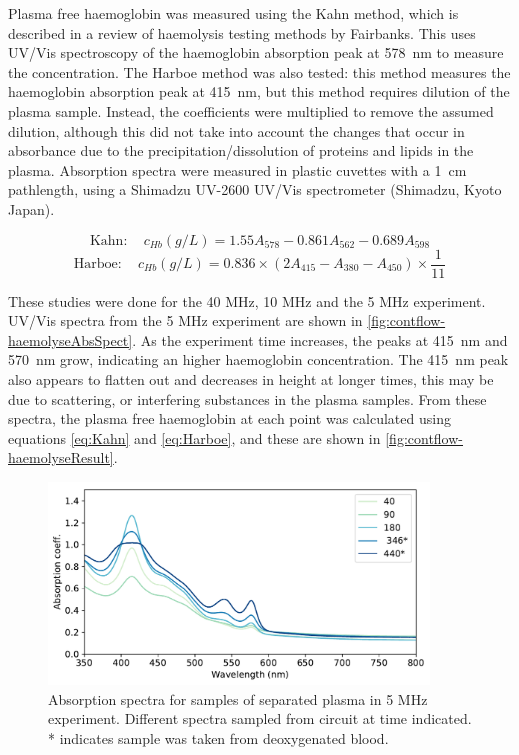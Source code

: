 Plasma free haemoglobin was measured using the Kahn method, which is described in a review of haemolysis testing methods by Fairbanks\cite{FairbanksMethodsmeasuringplasma1992}.
This uses UV/Vis spectroscopy of the haemoglobin absorption peak at \SI{578}{nm} to measure the concentration.
The Harboe method was also tested: this method measures the haemoglobin absorption peak at \SI{415}{nm}, but this method requires dilution of the plasma sample.
Instead, the coefficients were multiplied to remove the assumed dilution, although this did not take into account the changes that occur in absorbance due to the precipitation/dissolution of proteins and lipids in the plasma.
Absorption spectra were measured in plastic cuvettes with a \SI{1}{cm} pathlength, using a Shimadzu UV-2600 UV/Vis spectrometer (Shimadzu, Kyoto Japan).

\begin{equation}
\mathrm{Kahn: } \quad c_{Hb} (\si{g/L}) = 1.55A_{578} - 0.861A_{562} - 0.689A_{598}
\label{eq:Kahn}
\end{equation}
\begin{equation}
\mathrm{Harboe: } \quad c_{Hb} (\si{g/L}) = 0.836 \times \left( 2A_{415} - A_{380} - A_{450}\right) \times \frac{1}{11}
\label{eq:Harboe}
\end{equation}

These studies were done for the 40 MHz, 10 MHz and the 5 MHz experiment.
UV/Vis spectra from the 5 MHz experiment are shown in \autoref{fig:contflow-haemolyseAbsSpect}.
As the experiment time increases, the peaks at \SI{415}{nm} and \SI{570}{nm} grow, indicating an higher haemoglobin concentration.
The \SI{415}{nm} peak also appears to flatten out and decreases in height at longer times, this may be due to scattering, or interfering substances in the plasma samples.
From these spectra, the plasma free haemoglobin at each point was calculated using equations \ref{eq:Kahn} and \ref{eq:Harboe}, and these are shown in \autoref{fig:contflow-haemolyseResult}.

\begin{figure}[t]
\centering
\includegraphics[width=0.9\textwidth]{figures/contflow/haemolyseAbsSpect.pdf}
\caption[Absorption spectra for samples of separated plasma in 5 MHz experiment]{Absorption spectra for samples of separated plasma in 5 MHz experiment. Different spectra sampled from circuit at time indicated. * indicates sample was taken from deoxygenated blood.}
\label{fig:contflow-haemolyseAbsSpect}
\end{figure}

